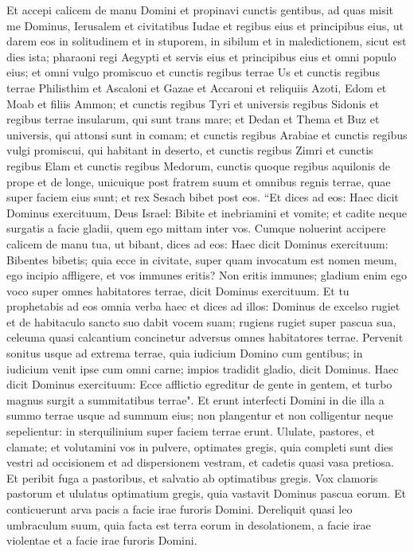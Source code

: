 \begin{biblechapter}
\verse Et accepi calicem de manu Domini et propinavi cunctis gentibus, ad quas misit me Dominus, 
\verse Ierusalem et civitatibus Iudae et regibus eius et principibus eius, ut darem eos in solitudinem et in stuporem, in sibilum et in maledictionem, sicut est dies ista; 
\verse pharaoni regi Aegypti et servis eius et principibus eius et omni populo eius; 
\verse et omni vulgo promiscuo et cunctis regibus terrae Us et cunctis regibus terrae Philisthim et Ascaloni et Gazae et Accaroni et reliquiis Azoti, 
\verse Edom et Moab et filiis Ammon;  
\verse et cunctis regibus Tyri et universis regibus Sidonis et regibus terrae insularum, qui sunt trans mare; 
\verse et Dedan et Thema et Buz et universis, qui attonsi sunt in comam; 
\verse et cunctis regibus Arabiae et cunctis regibus vulgi promiscui, qui habitant in deserto, 
\verse et cunctis regibus Zimri et cunctis regibus Elam et cunctis regibus Medorum, 
\verse cunctis quoque regibus aquilonis de prope et de longe, unicuique post fratrem suum et omnibus regnis terrae, quae super faciem eius sunt; et rex Sesach bibet post eos. 
\verse “Et dices ad eos: Haec dicit Dominus exercituum, Deus Israel: Bibite et inebriamini et vomite; et cadite neque surgatis a facie gladii, quem ego mittam inter vos. 
\verse Cumque noluerint accipere calicem de manu tua, ut bibant, dices ad eos: Haec dicit Dominus exercituum: Bibentes bibetis; 
\verse quia ecce in civitate, super quam invocatum est nomen meum, ego incipio affligere, et vos immunes eritis? Non eritis immunes; gladium enim ego voco super omnes habitatores terrae, dicit Dominus exercituum. 
\verse Et tu prophetabis ad eos omnia verba haec et dices ad illos: Dominus de excelso rugiet et de habitaculo sancto suo dabit vocem suam; rugiens rugiet super pascua sua, celeuma quasi calcantium concinetur adversus omnes habitatores terrae. 
\verse Pervenit sonitus usque ad extrema terrae, quia iudicium Domino cum gentibus; in iudicium venit ipse cum omni carne; impios tradidit gladio, dicit Dominus. 
\verse Haec dicit Dominus exercituum: Ecce afflictio egreditur de gente in gentem, et turbo magnus surgit a summitatibus terrae". 
\verse Et erunt interfecti Domini in die illa a summo terrae usque ad summum eius; non plangentur et non colligentur neque sepelientur: in sterquilinium super faciem terrae erunt. 
\verse Ululate, pastores, et clamate; et volutamini vos in pulvere, optimates gregis, quia completi sunt dies vestri ad occisionem et ad dispersionem vestram, et cadetis quasi vasa pretiosa. 
\verse Et peribit fuga a pastoribus, et salvatio ab optimatibus gregis. 
\verse Vox clamoris pastorum et ululatus optimatium gregis, quia vastavit Dominus pascua eorum. 
\verse Et conticuerunt arva pacis a facie irae furoris Domini. 
\verse Dereliquit quasi leo umbraculum suum, quia facta est terra eorum in desolationem, a facie irae violentae et a facie irae furoris Domini. 
\end{biblechapter}

